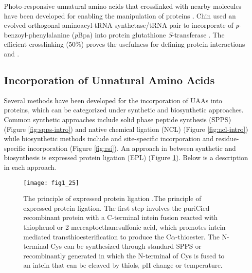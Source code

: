 \begin{refsection}
Photo-responsive unnatural amino acids that crosslinked with nearby
molecules have been developed for enabling the  manipulation of
proteins \cite{Chin2002}. Chin  used an evolved orthogonal
aminoacyl-tRNA synthetase/tRNA pair to incorporate of
\emph{p}-benzoyl-phenylalanine (\emph{p}Bpa) into protein glutathione
\emph{S}-transferase \cite{Chin2002}. The efficient crosslinking (50\%) proves
the usefulness for defining protein interactions  and . 

\subsection{Incorporation of Unnatural Amino Acids} 
\label{sec:rsi-intro}

Several methods have been developed for the incorporation of UAAs into
proteins, which can be categorized under synthetic and biosynthetic approaches.
Common synthetic approaches include solid phase peptide synthesis (SPPS)
(Figure \ref{fig:spps-intro}) and native chemical ligation (NCL) (Figure
\ref{fig:ncl-intro}) while biosynthetic methods include  and
 site-specific incorporation \cite{Cellitti2008,Hassan2008} and
residue-specific incorporation \cite{Johnson2010} (Figure \ref{fig:rsi}). An
approach in between synthetic and biosynthesis is expressed protein ligation
(EPL) \cite{Muir1998} (Figure \ref{fig:epl-intro}). Below is a description in
each approach.
\begin{figure}[h!] \centering \texttt{[image: fig1\_25]}
    \caption[The principle of expressed protein ligation. The first step
        involves the puriCied recombinant protein with a C-terminal intein
        fusion reacted with thiophenol or 2-mercaptoethanesulfonic acid, which
        promotes intein mediated transthioesterification to produce the
        C$\alpha$-thioester. The N-terminal Cys can be synthesized through
        standard SPPS or recombinantly generated in which the N-terminal of Cys
        is fused to an intein that can be cleaved by thiols, pH change or
    temperature.]{The principle of expressed protein ligation
        \cite{Muir1998,Theato2013}.The principle of expressed protein ligation. The first
        step involves the puriCied recombinant protein with a C-terminal intein
        fusion reacted with thiophenol or 2-mercaptoethanesulfonic acid, which
        promotes intein mediated transthioesterification to produce the
        C$\alpha$-thioester. The N-terminal Cys can be synthesized through
        standard SPPS or recombinantly generated in which the N-terminal of Cys
        is fused to an intein that can be cleaved by thiols, pH change or
    temperature.} \label{fig:epl-intro} 
\end{figure}


\end{refsection}
